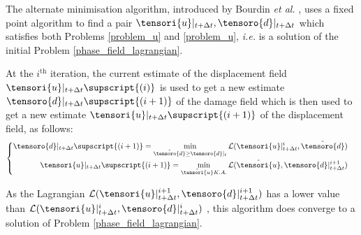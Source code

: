 The alternate minimisation algorithm, introduced by Bourdin \textit{et al.}
\cite{2000_BOURDIN_FRACNFORT_MARIGO_NumericalExperimentsInRevisitedBrittleFracture}, uses a fixed point algorithm to find a pair
$\tensori{u}\vert_{t+\Delta t}, \tensoro{d}\vert_{t+\Delta t}$
which satisfies both Problems
\ref{problem_u} and \ref{problem_u}, \textit{i.e.} is a
solution of the initial Problem \ref{phase_field_lagrangian}.

At the $i^{\text{th}}$ iteration, the current estimate of the
displacement field
$\tensori{u}\vert_{t+\Delta t}\supscript{(i)}$
is used to get a new estimate
$\tensoro{d}\vert_{t+\Delta t}\supscript{(i+1)}$
of the damage field which is then used to get a new
estimate
$\tensori{u}\vert_{t+\Delta t}\supscript{(i+1)}$
of the displacement field, as
follows:
\begin{equation}
    \begin{cases}
        \begin{aligned}
            \tensoro{d}\vert_{t+\Delta t}\supscript{(i+1)}
            =
            \min_{\hat{\tensoro{d}} \geq \tensoro{d}\vert_{t}}
            \mathcal{L}(\tensori{u}\vert_{t + \Delta t}^{i}, \hat{\tensoro{d}})
            \\
            \tensori{u}\vert_{t+\Delta t}\supscript{(i+1)}
            =
            \min_{\hat{\tensori{u}} K.A.}
            \mathcal{L}(\hat{\tensori{u}}, \tensoro{d}\vert_{t + \Delta t}^{i+1})
        \end{aligned}
    \end{cases}
\end{equation}


As the Lagrangian
$\mathcal{L}(\tensori{u}\vert_{t + \Delta t}^{i+1}, \tensoro{d}\vert_{t + \Delta t}^{i+1})$
has a lower value than
$\mathcal{L}(\tensori{u}\vert_{t + \Delta t}^{i}, \tensoro{d}\vert_{t + \Delta t}^{i})$
,
this algorithm does converge to a solution of Problem
\ref{phase_field_lagrangian}.

